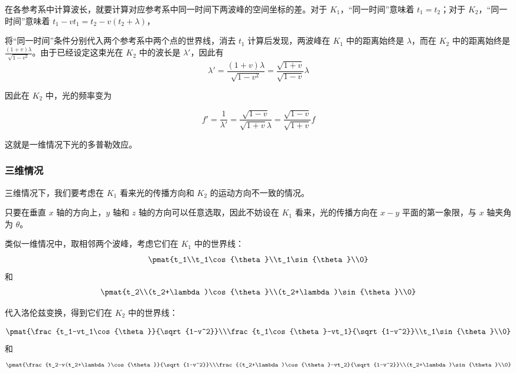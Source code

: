 在各参考系中计算波长，就要计算对应参考系中同一时间下两波峰的空间坐标的差。对于 $K_1$，“同一时间”意味着 $t_1=t_2$；对于 $K_2$，“同一时间”意味着 $t_1-vt_1=t_2-v(t_2+\lambda)$，

将“同一时间”条件分别代入两个参考系中两个点的世界线，消去 $t_1$ 计算后发现，两波峰在 $K_1$ 中的距离始终是 $\lambda$，而在 $K_2$ 中的距离始终是 $\frac{(1+v)\lambda}{\sqrt{1-v^2}}$。由于已经设定这束光在 $K_2$ 中的波长是 $\lambda'$，因此有
\begin{equation}
\lambda'=\frac{(1+v)\lambda}{\sqrt{1-v^2}}=\frac{\sqrt{1+v}}{\sqrt{1-v}}\lambda
\end{equation}

因此在 $K_2$ 中，光的频率变为

\begin{equation}\label{RelDop_eq2}
f'=\frac{1}{\lambda'}=\frac{\sqrt{1-v}}{\sqrt{1+v}\lambda}=\frac{\sqrt{1-v}}{\sqrt{1+v}}f
\end{equation}

这就是一维情况下光的多普勒效应。

\subsubsection{三维情况}

三维情况下，我们要考虑在 $K_1$ 看来光的传播方向和 $K_2$ 的运动方向不一致的情况。

只要在垂直 $x$ 轴的方向上，$y$ 轴和 $z$ 轴的方向可以任意选取，因此不妨设在 $K_1$ 看来，光的传播方向在 $x-y$ 平面的第一象限，与 $x$ 轴夹角为 $\theta$。

类似一维情况中，取相邻两个波峰，考虑它们在 $K_1$ 中的世界线：
\begin{equation}
\pmat{t_1\\t_1\cos{\theta}\\t_1\sin{\theta}\\0}
\end{equation}
和
\begin{equation}
\pmat{t_2\\(t_2+\lambda)\cos{\theta}\\(t_2+\lambda)\sin{\theta}\\0}
\end{equation}

代入洛伦兹变换，得到它们在 $K_2$ 中的世界线：

\begin{equation}
\pmat{\frac{t_1-vt_1\cos{\theta}}{\sqrt{1-v^2}}\\\frac{t_1\cos{\theta}-vt_1}{\sqrt{1-v^2}}\\t_1\sin{\theta}\\0}
\end{equation}
和
\begin{equation}
\pmat{\frac{t_2-v(t_2+\lambda)\cos{\theta}}{\sqrt{1-v^2}}\\\frac{(t_2+\lambda)\cos{\theta}-vt_2}{\sqrt{1-v^2}}\\(t_2+\lambda)\sin{\theta}\\0}
\end{equation}

